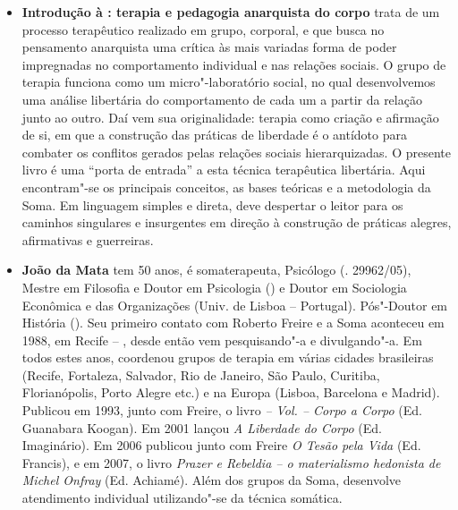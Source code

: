 \begin{itemize}
\item \textbf{Introdução à : terapia e pedagogia anarquista do corpo} trata de um processo terapêutico realizado em grupo, corporal, e que busca no pensamento anarquista uma crítica às mais variadas forma de poder impregnadas no comportamento individual e nas relações sociais.
O grupo de terapia funciona como um micro"-laboratório social, no qual desenvolvemos uma análise libertária do comportamento de cada um a partir da relação junto ao outro. Daí vem sua originalidade: terapia como criação e afirmação de si, em que a construção das práticas de liberdade é o antídoto para combater os conflitos gerados pelas relações sociais hierarquizadas.
O presente livro é uma ``porta de entrada'' a esta técnica terapêutica libertária. Aqui encontram"-se os principais conceitos, as bases teóricas e a metodologia da Soma. Em linguagem simples e direta, deve despertar o leitor para os caminhos singulares e insurgentes em direção à construção de práticas alegres, afirmativas e guerreiras.
  
\item \textbf{João da Mata} tem 50 anos, é somaterapeuta, Psicólogo (. 29962/05), Mestre em Filosofia e Doutor em Psicologia () e Doutor em Sociologia Econômica e das Organizações (Univ. de Lisboa -- Portugal). Pós"-Doutor em História ().
Seu primeiro contato com Roberto Freire e a Soma aconteceu em 1988, em Recife -- , desde então vem pesquisando"-a e divulgando"-a. Em todos estes anos, coordenou grupos de terapia em várias cidades brasileiras
(Recife, Fortaleza, Salvador, Rio de Janeiro, São Paulo, Curitiba, Florianópolis, Porto Alegre etc.) e na Europa (Lisboa, Barcelona e Madrid).
Publicou em 1993, junto com Freire, o livro \emph{ -- Vol.  -- Corpo a Corpo} (Ed. Guanabara Koogan). Em 2001 lançou \emph{A Liberdade do Corpo} (Ed. Imaginário). Em 2006 publicou junto com Freire \emph{O Tesão pela Vida} (Ed. Francis), e em 2007, o livro \emph{Prazer e Rebeldia -- o materialismo hedonista de Michel Onfray} (Ed. Achiamé).
Além dos grupos da Soma, desenvolve atendimento individual utilizando"-se da técnica somática.

\end{itemize}


